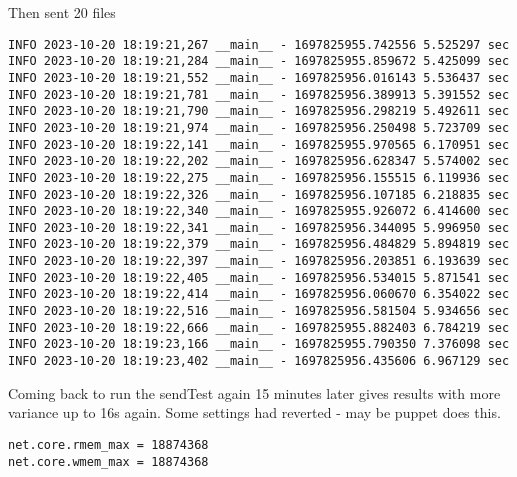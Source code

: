 Then sent 20 files
\begin{verbatim}
INFO 2023-10-20 18:19:21,267 __main__ - 1697825955.742556 5.525297 sec
INFO 2023-10-20 18:19:21,284 __main__ - 1697825955.859672 5.425099 sec
INFO 2023-10-20 18:19:21,552 __main__ - 1697825956.016143 5.536437 sec
INFO 2023-10-20 18:19:21,781 __main__ - 1697825956.389913 5.391552 sec
INFO 2023-10-20 18:19:21,790 __main__ - 1697825956.298219 5.492611 sec
INFO 2023-10-20 18:19:21,974 __main__ - 1697825956.250498 5.723709 sec
INFO 2023-10-20 18:19:22,141 __main__ - 1697825955.970565 6.170951 sec
INFO 2023-10-20 18:19:22,202 __main__ - 1697825956.628347 5.574002 sec
INFO 2023-10-20 18:19:22,275 __main__ - 1697825956.155515 6.119936 sec
INFO 2023-10-20 18:19:22,326 __main__ - 1697825956.107185 6.218835 sec
INFO 2023-10-20 18:19:22,340 __main__ - 1697825955.926072 6.414600 sec
INFO 2023-10-20 18:19:22,341 __main__ - 1697825956.344095 5.996950 sec
INFO 2023-10-20 18:19:22,379 __main__ - 1697825956.484829 5.894819 sec
INFO 2023-10-20 18:19:22,397 __main__ - 1697825956.203851 6.193639 sec
INFO 2023-10-20 18:19:22,405 __main__ - 1697825956.534015 5.871541 sec
INFO 2023-10-20 18:19:22,414 __main__ - 1697825956.060670 6.354022 sec
INFO 2023-10-20 18:19:22,516 __main__ - 1697825956.581504 5.934656 sec
INFO 2023-10-20 18:19:22,666 __main__ - 1697825955.882403 6.784219 sec
INFO 2023-10-20 18:19:23,166 __main__ - 1697825955.790350 7.376098 sec
INFO 2023-10-20 18:19:23,402 __main__ - 1697825956.435606 6.967129 sec
\end{verbatim}

Coming back to run the sendTest again 15 minutes  later gives results with more variance up to 16s again.
Some settings had reverted - may be puppet does this.
\begin{verbatim}
net.core.rmem_max = 18874368
net.core.wmem_max = 18874368
\end{verbatim}

